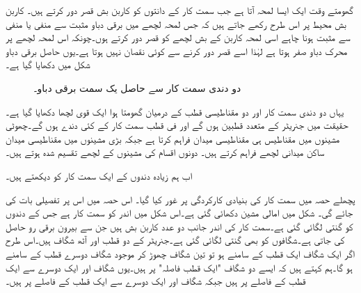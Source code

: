 گھومتے وقت ایک ایسا لمحہ آتا ہے جب سمت کار کے  دانتوں کو کاربن بش  قصر دور کرتے ہیں۔ کاربن بش  محیط پر اس طرح رکھے جاتے ہیں کہ جس لمحہ لچھے میں برقی دباو مثبت سے منفی یا منفی سے مثبت ہونا چاہے اسی لمحہ کاربن کے بش لچھے کو قصر دور کرتے ہوں۔چونکہ اس لمحہ  لچھے پر محرک  دباو صفر ہوتا ہے لہٰذا اسے قصر دور کرنے سے کوئی نقصان نہیں ہوتا ہے۔یوں حاصل برقی دباو شکل   میں دکھایا گیا ہے۔
\begin{figure}
\centering
\caption{دو دندی سمت کار سے حاصل یک سمت  برقی دباو۔}
\label{شکل_یکسمتی_دو_دندوں_کا_سمتکار}
\end{figure}


یہاں دو دندی سمت کار اور دو مقناطیسی قطب کے درمیان گھومتا ہوا ایک قوی لچھا دکھایا گیا ہے۔حقیقت میں جنریٹر کے متعدد قطبین ہوں گے اور فی قطب  سمت کار کے کئی دندے ہوں گے۔چھوٹی مشینوں میں مقناطیس ہی مقناطیسی میدان  فراہم کرتا ہے جبکہ بڑی مشینوں میں مقناطیسی میدان ساکن میدانی لچھے فراہم کرتے ہیں۔ دونوں اقسام کی مشینوں  کے لچھے تقسیم شدہ ہوتے ہیں۔

اب ہم زیادہ دندوں کے ایک سمت کار کو دیکھتے ہیں۔

پچھلے حصہ میں سمت کار کی بنیادی کارکردگی پر غور کیا گیا۔ اس حصہ میں اس پر تفصیلی بات کی جائے گی۔ شکل  میں امالی مشین دکھائی گئی ہے۔اس شکل میں اندر کو سمت کار ہے جس کے دندوں کو گنتی لگائی گئی ہے۔سمت کار کی اندر جانب دو عدد  کاربن بش ہیں جن سے   بیرون  برقی رو  حاصل کی جاتی ہے۔شگافوں کو بھی گنتی لگائی گئی  ہے۔جنریٹر کے دو قطب اور آٹھ شگاف ہیں۔اس طرح اگر ایک شگاف ایک قطب کے سامنے ہو تو تین شگاف چھوڑ کر موجود شگاف دوسرے قطب کے سامنے ہو گا۔ہم کہتے ہیں کہ ایسے دو شگاف "ایک قطب فاصلہ" پر ہیں۔یوں شگاف  اور  ایک دوسرے سے ایک قطب کے فاصلے پر ہیں جبکہ    شگاف  اور  ایک دوسرے سے ایک قطب کے فاصلے پر ہیں۔

